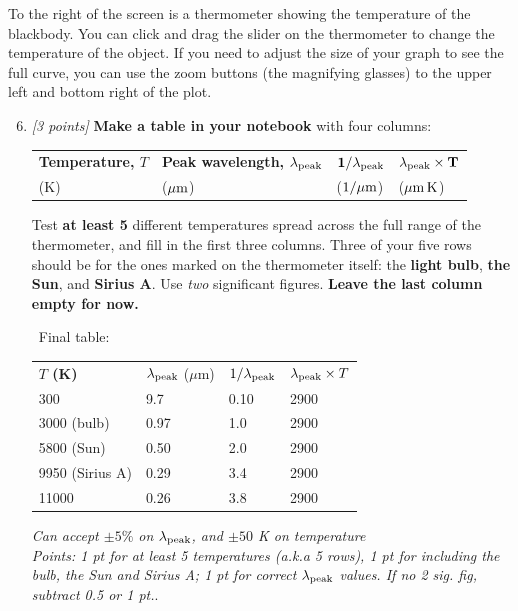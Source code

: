 \documentclass[11pt]{article}
\newcommand{\ans}[1]{%
  \par\smallskip\noindent{\color{blue!55!black}\textbf{Answer:}}\ #1\par\smallskip}
\begin{document}
To the right of the screen is a thermometer showing the temperature of the blackbody. You can click and drag the slider on the thermometer to change the temperature of the object. If you need to adjust the size of your graph to see the full curve, you can use the zoom buttons (the magnifying glasses) to the upper left and bottom right of the plot.

\begin{enumerate}
    \setcounter{enumi}{5}

    \item \textit{[3 points]} \textbf{Make a table in your notebook} with four columns:

    \smallskip
    \begin{center}
    \begin{tabular}{@{}llll@{}}
    \textbf{Temperature, $T$} & \textbf{Peak wavelength, $\lambda_{\rm peak}$} &
    $\mathbf{1/\lambda_{\rm peak}}$ & $\mathbf{\lambda_{\rm peak} \times T}$ \\
    (K) & ($\rm \mu m$) & ($\rm 1/\mu m$) & ($\rm \mu m\,K$)
    \end{tabular}
    \end{center}

    \smallskip
    \smallskip
    Test \textbf{at least 5} different temperatures spread across the full range
    of the thermometer, and fill in the first three columns. Three of your five rows
    should be for the ones marked on the thermometer itself: the \textbf{light
    bulb}, \textbf{the Sun}, and \textbf{Sirius A}. Use
    \emph{two} significant figures. \textbf{Leave the last column empty for
    now.}

    \ans{Final table:
    \smallskip
    \begin{center}
    \begin{tabular}{@{}llll@{}}
    \textbf{$T$ (K)} & $\lambda_{\rm peak}$ ($\mu$m) & $1/\lambda_{\rm peak}$ & $\lambda_{\rm peak}\times T$ \\[2pt]
    300              & 9.7  & 0.10 & 2900 \\
    3000 (bulb)      & 0.97 & 1.0  & 2900 \\
    5800 (Sun)       & 0.50 & 2.0  & 2900 \\
    9950 (Sirius A)  & 0.29 & 3.4  & 2900 \\
    11000            & 0.26 & 3.8  & 2900 \\
    \end{tabular}
    \end{center}
    \emph{Can accept $\pm5\%$ on $\lambda_{\rm peak}$, and $\pm50$ K on temperature}
    \\[2pt]
    \emph{Points: 1 pt for at least 5 temperatures (a.k.a 5 rows), 1 pt for
    including the bulb, the Sun and Sirius A; 1 pt for correct
    $\lambda_{\rm peak}$ values. If no 2 sig. fig, subtract 0.5 or 1 pt.}.}


\end{enumerate}
\end{document}
